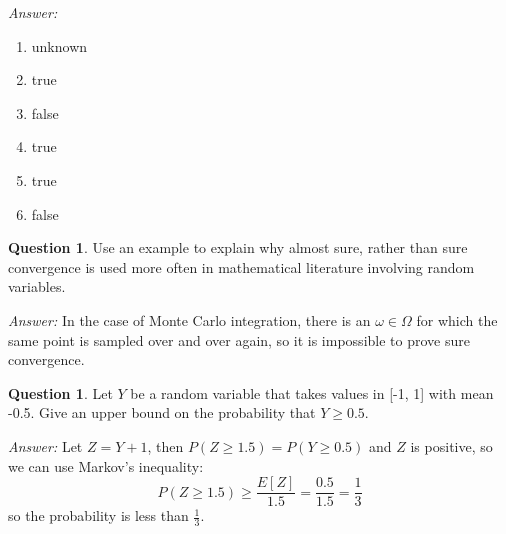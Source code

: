 \documentclass{article}
\theoremstyle{definition}
\newtheorem{question}[thm]{Question}
\newenvironment{answer}{\noindent\textit{Answer:}}{}
\begin{document}
\begin{answer} 
     \begin{enumerate}[label=\alph*)]
        \item unknown
        \item true
        \item false
        \item true
        \item true
        \item false
    \end{enumerate}
\end{answer}

\begin{question}
    Use an example to explain why almost sure, rather than sure convergence is used more often in mathematical literature involving random variables.
\end{question}

\begin{answer}
    In the case of Monte Carlo integration, there is an $\omega \in \Omega$ for which the same point is sampled over and over again, so it is impossible to prove sure convergence.
\end{answer}

\begin{question}
    Let $Y$ be a random variable that takes values in [-1, 1] with mean -0.5. Give an upper bound on the probability that $Y \geq 0.5$.
\end{question}

\begin{answer}
    Let $Z=Y+1$, then $P(Z \geq 1.5) = P(Y \geq 0.5)$ and $Z$ is positive, so we can use Markov's inequality:
    $$P(Z \geq 1.5) \geq \frac{E[Z]}{1.5} = \frac{0.5}{1.5} = \frac{1}{3}$$
    so the probability is less than $\frac{1}{3}$.
\end{answer}
\end{document}
